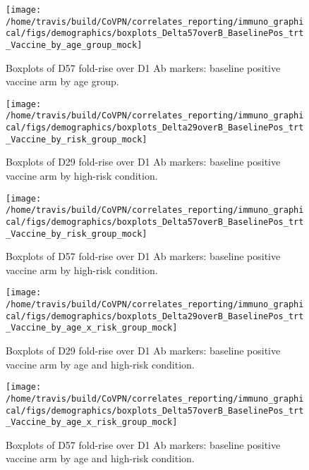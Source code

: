 \documentclass[]{book}
\theoremstyle{definition}
\theoremstyle{definition}
\theoremstyle{definition}
\newcommand{\1}{\mathbbm{1}}
\begin{document}
\begin{figure}[H]

{\centering \texttt{[image: /home/travis/build/CoVPN/correlates\_reporting/immuno\_graphical/figs/demographics/boxplots\_Delta57overB\_BaselinePos\_trt\_Vaccine\_by\_age\_group\_mock]} 

}

\caption{Boxplots of D57 fold-rise over D1 Ab markers: baseline positive vaccine arm by age group.}\label{fig:unnamed-chunk-167}
\end{figure}

\begin{figure}[H]

{\centering \texttt{[image: /home/travis/build/CoVPN/correlates\_reporting/immuno\_graphical/figs/demographics/boxplots\_Delta29overB\_BaselinePos\_trt\_Vaccine\_by\_risk\_group\_mock]} 

}

\caption{Boxplots of D29 fold-rise over D1 Ab markers: baseline positive vaccine arm by high-risk condition.}\label{fig:unnamed-chunk-170}
\end{figure}

\begin{figure}[H]

{\centering \texttt{[image: /home/travis/build/CoVPN/correlates\_reporting/immuno\_graphical/figs/demographics/boxplots\_Delta57overB\_BaselinePos\_trt\_Vaccine\_by\_risk\_group\_mock]} 

}

\caption{Boxplots of D57 fold-rise over D1 Ab markers: baseline positive vaccine arm by high-risk condition.}\label{fig:unnamed-chunk-171}
\end{figure}

\begin{figure}[H]

{\centering \texttt{[image: /home/travis/build/CoVPN/correlates\_reporting/immuno\_graphical/figs/demographics/boxplots\_Delta29overB\_BaselinePos\_trt\_Vaccine\_by\_age\_x\_risk\_group\_mock]} 

}

\caption{Boxplots of D29 fold-rise over D1 Ab markers: baseline positive vaccine arm by age and high-risk condition.}\label{fig:unnamed-chunk-174}
\end{figure}

\begin{figure}[H]

{\centering \texttt{[image: /home/travis/build/CoVPN/correlates\_reporting/immuno\_graphical/figs/demographics/boxplots\_Delta57overB\_BaselinePos\_trt\_Vaccine\_by\_age\_x\_risk\_group\_mock]} 

}

\caption{Boxplots of D57 fold-rise over D1 Ab markers: baseline positive vaccine arm by age and high-risk condition.}\label{fig:unnamed-chunk-175}
\end{figure}
\end{document}
